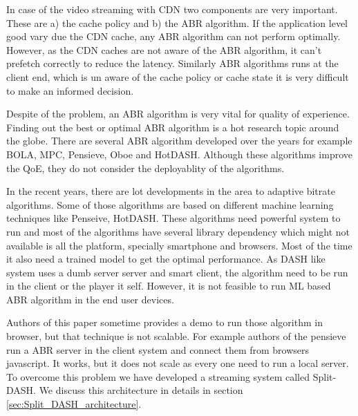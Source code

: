 In case of the video streaming with CDN two components are very important. These are a) the cache policy and b) the ABR algorithm. If the application level good vary due the CDN cache, any ABR algorithm can not perform optimally. However, as the CDN caches are not aware of the ABR algorithm, it can't prefetch correctly to reduce the latency. Similarly ABR algorithms runs at the client end, which is un aware of the cache policy or cache state it is very difficult to make an informed decision.


Despite of the problem, an ABR algorithm is very vital for quality of experience. Finding out the best or optimal ABR algorithm is a hot research topic around the globe. There are several ABR algorithm developed over the years for example BOLA, MPC, Pensieve, Oboe and HotDASH. Although these algorithms improve the QoE, they do not consider the deployablity of the algorithms.

In the recent years, there are lot developments in the area to adaptive bitrate algorithms. Some of those algorithms are based on different machine learning techniques like Penseive, HotDASH. These algorithms need powerful system to run and most of the algorithms have several library dependency which might not available is all the platform, specially smartphone and browsers. Most of the time it also need a trained model to get the optimal performance. As DASH like system uses a dumb server server and smart client, the algorithm need to be run in the client or the player it self. However, it is not feasible to run ML based ABR algorithm in the end user devices. 

Authors of this paper sometime provides a demo to run those algorithm in browser, but that technique is not scalable. For example authors of the pensieve run a ABR server in the client system and connect them from browsers javascript. It works, but it does not scale as every one need to run a local server. To overcome this problem we have developed a streaming system called Split-DASH. We discuss this architecture in details in section \ref{sec:Split_DASH_architecture}. 
